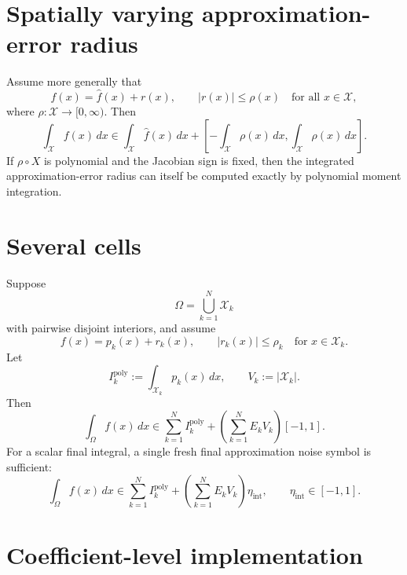 \documentclass[11pt]{article}
\newcommand{\abs}[1]{\left\lvert #1\right\rvert}
\begin{document}
\section{Spatially varying approximation-error radius}

Assume more generally that
\begin{equation}
    f(x)=\widehat f(x)+r(x),
    \qquad
    \abs{r(x)}\leq \rho(x)
    \quad
    \text{for all }x\in\mathcal{X},
    \label{eq:variable-remainder}
\end{equation}
where \(\rho:\mathcal{X}\to[0,\infty)\). Then
\begin{equation}
    \int_{\mathcal{X}} f(x)\,dx
    \in
    \int_{\mathcal{X}}\widehat f(x)\,dx
    +
    \left[
        -\int_{\mathcal{X}}\rho(x)\,dx,
        \int_{\mathcal{X}}\rho(x)\,dx
    \right].
    \label{eq:variable-remainder-integral}
\end{equation}
If \(\rho\circ X\) is polynomial and the Jacobian sign is fixed, then the
integrated approximation-error radius can itself be computed exactly by
polynomial moment integration.

\section{Several cells}

Suppose
\[
    \Omega=\bigcup_{k=1}^N\mathcal{X}_k
\]
with pairwise disjoint interiors, and assume
\[
    f(x)=p_k(x)+r_k(x),
    \qquad
    \abs{r_k(x)}\leq \rho_k
    \quad
    \text{for }x\in\mathcal{X}_k.
\]
Let
\[
    I_k^{\mathrm{poly}}:=\int_{\mathcal{X}_k}p_k(x)\,dx,
    \qquad
    V_k:=\abs{\mathcal{X}_k}.
\]
Then
\begin{equation}
    \boxed{
    \int_\Omega f(x)\,dx
    \in
    \sum_{k=1}^N I_k^{\mathrm{poly}}
    +
    \left(\sum_{k=1}^N E_kV_k\right)[-1,1].
    }
    \label{eq:multi-cell-integral}
\end{equation}
For a scalar final integral, a single fresh final approximation noise symbol
is sufficient:
\begin{equation}
    \int_\Omega f(x)\,dx
    \in
    \sum_{k=1}^N I_k^{\mathrm{poly}}
    +
    \left(\sum_{k=1}^N E_kV_k\right)\eta_{\mathrm{int}},
    \qquad
    \eta_{\mathrm{int}}\in[-1,1].
\end{equation}

\section{Coefficient-level implementation}
\end{document}
